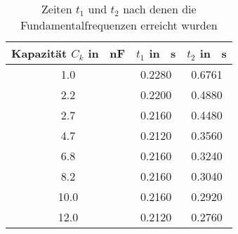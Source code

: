 \begin{table}[h!]
\begin{center}
\begin{tabular}{c | c | c}
	Kapazität $C_k$ in \SI{}{\nano\farad} & $t_1$ in \SI{}{\second} & $t_2$ in \SI{}{\second} \\
\hline
	1.0 & 0.2280 & 0.6761 \\
	2.2 & 0.2200 & 0.4880 \\
	2.7 & 0.2160 & 0.4480 \\
	4.7 & 0.2120 & 0.3560 \\
	6.8 & 0.2160 & 0.3240 \\
	8.2 & 0.2160 & 0.3040 \\
	10.0 & 0.2160 & 0.2920 \\
	12.0 & 0.2120 & 0.2760 \\
\end{tabular}
\end{center}
\caption{Zeiten $t_1$ und $t_2$ nach denen die Fundamentalfrequenzen erreicht wurden}
\label{fig:Zeiten}
\end{table}